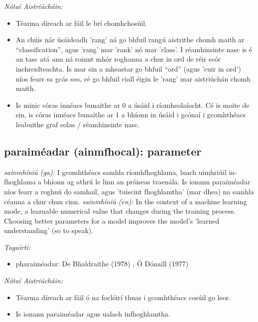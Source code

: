 \documentclass{article}
\begin{document}
 \noindent \textit{Nótaí Aistriúcháin:}
\begin{itemize}
	\item Téarma díreach ar fáil le brí chomhchosúil.
	\item An chúis nár úsáideadh 'rang' ná go bhfuil rangú aistrithe chomh maith ar “classification”, agus 'rang' mar 'rank' nó mar 'class'. I réamhinsinte nasc is é an tasc atá ann ná roinnt mhór roghanna a chur in ord de réir scór inchreidteachta. Is mar sin a mheastar go bhfuil “ord” (agus 'cuir in ord') níos fearr sa gcás seo, cé go bhfuil ciall éigin le 'rang' mar aistriúchán chomh maith.
	\item Is minic córas innéacs bunaithe ar 0 a úsáid i ríomheolaíocht. Cé is moite de sin, is córas innéacs bunaithe ar 1 a bhíonn in úsáid i gcónaí i gcomhthéacs leabuithe graf eolas / réamhinsinte nasc.
\end{itemize}


\subsection*{paraiméadar (ainmfhocal): parameter} 
 \noindent \textit{sainmhíniú (ga):} I gcomhthéacs samhla ríomhfhoghlama, luach uimhriúil in-fhoghlama a bhíonn ag athrú le linn an próiseas traenála. Is ionann paraiméadar níos fearr a roghnú do samhail, agus 'tuiscint fhoghlamtha' (mar dhea) na samhla céanna a chur chun cinn.
\newline\newline
 \noindent \textit{sainmhíniú (en):} In the context of a machine learning mode, a learnable numerical value that changes during the training process. Choosing better parameters for a model improves the model's 'learned understanding' (so to speak).
\newline

 \noindent \textit{Tagairtí:}
\begin{itemize}
	\item pharaiméadar: De Bhaldraithe (1978) \cite{de-bhaldraithe}, Ó Dónaill (1977) \cite{odonaill}
\end{itemize}

 \noindent \textit{Nótaí Aistriúcháin:}
\begin{itemize}
	\item Téarma díreach ar fáil ó na foclóirí thuas i gcomhthéacs cosúil go leor.
	\item Is ionann paraiméadar agus ualach infhoghlamtha.
\end{itemize}
\end{document}
